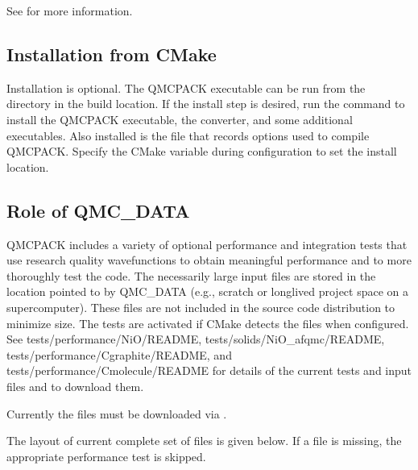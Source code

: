 \documentclass[letterpaper,10pt,english]{sphinxmanual}
\begin{document}

See  for more information.


\subsection{Installation from CMake}
\label{\detokenize{installation:installation-from-cmake}}
Installation is optional. The QMCPACK executable can be run from the  directory in the build location.
If the install step is desired, run the  command to install the QMCPACK executable, the converter,
and some additional executables.
Also installed is the  file that records options used to compile QMCPACK.
Specify the  CMake variable during configuration to set the install location.


\subsection{Role of QMC\_DATA}
\label{\detokenize{installation:role-of-qmc-data}}
QMCPACK includes a variety of optional performance and integration
tests that use research quality wavefunctions to obtain meaningful
performance and to more thoroughly test the code. The necessarily
large input files are stored in the location pointed to by QMC\_DATA (e.g., scratch or long\sphinxhyphen{}lived project space on a supercomputer). These
files are not included in the source code distribution to minimize
size. The tests are activated if CMake detects the files when
configured. See tests/performance/NiO/README,
tests/solids/NiO\_afqmc/README, tests/performance/C\sphinxhyphen{}graphite/README, and tests/performance/C\sphinxhyphen{}molecule/README
for details of the current tests and input files and to download them.

Currently the files must be downloaded via .

The layout of current complete set of files is given below. If a file is missing, the appropriate performance test is skipped.
\end{document}
